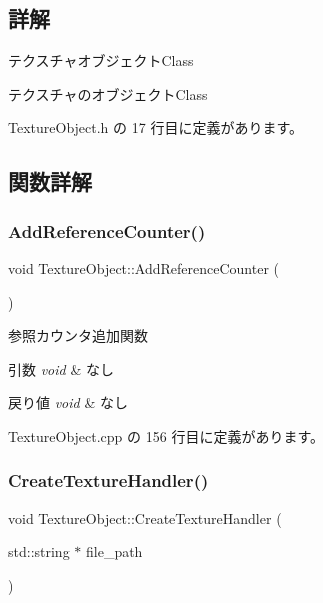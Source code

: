 \subsection{詳解}
テクスチャオブジェクト\+Class 

テクスチャのオブジェクト\+Class 

 Texture\+Object.\+h の 17 行目に定義があります。



\subsection{関数詳解}
\mbox{\label{class_texture_object_a25be861b1477ac0a6c848c43c0079af9}} 
\subsubsection{\texorpdfstring{Add\+Reference\+Counter()}{AddReferenceCounter()}}
{\footnotesize\ttfamily void Texture\+Object\+::\+Add\+Reference\+Counter (\begin{DoxyParamCaption}{ }\end{DoxyParamCaption})}



参照カウンタ追加関数 


\begin{DoxyParams}{引数}
{\em void} & なし \\
\hline
\end{DoxyParams}

\begin{DoxyRetVals}{戻り値}
{\em void} & なし \\
\hline
\end{DoxyRetVals}


 Texture\+Object.\+cpp の 156 行目に定義があります。

\mbox{\label{class_texture_object_a16c58757e7b36b5447cc8d2c20c66b55}} 
\subsubsection{\texorpdfstring{Create\+Texture\+Handler()}{CreateTextureHandler()}}
{\footnotesize\ttfamily void Texture\+Object\+::\+Create\+Texture\+Handler (\begin{DoxyParamCaption}\item[{std\+::string $\ast$}]{file\+\_\+path }\end{DoxyParamCaption})\hspace{0.3cm}{\ttfamily [private]}}



